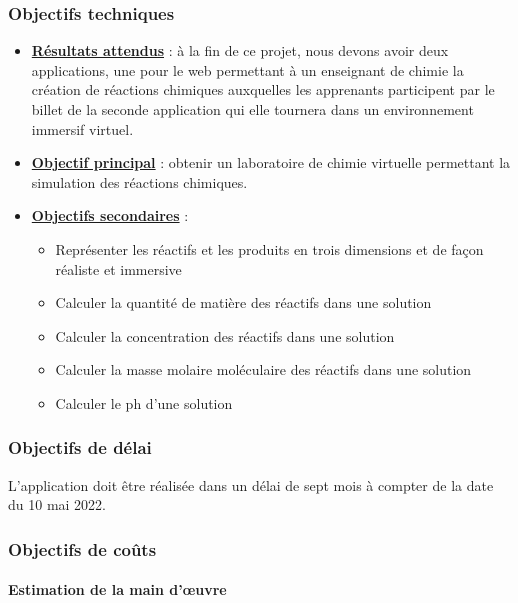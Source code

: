 \subsubsection{Objectifs techniques}
\begin{itemize}
	\item \textbf{\underline{Résultats attendus}} : à la fin de ce projet, nous devons avoir deux applications, une pour le web permettant à un enseignant de chimie la création de réactions chimiques auxquelles les apprenants participent par le billet de la seconde application qui elle tournera dans un environnement immersif virtuel.
	\item \textbf{\underline{Objectif principal}} : obtenir un laboratoire de chimie virtuelle permettant la simulation des réactions chimiques.
	\item \textbf{\underline{Objectifs secondaires}} :
	      \begin{itemize}
		      \item Représenter les réactifs et les produits en trois dimensions et de façon réaliste et immersive
		      \item Calculer la quantité de matière des réactifs dans une solution
		      \item Calculer la concentration des réactifs dans une solution
		      \item Calculer la masse molaire moléculaire des réactifs dans une solution
		      \item Calculer le ph d’une solution
	      \end{itemize}
\end{itemize}

\subsubsection{Objectifs de délai}

L’application doit être réalisée dans un délai de sept mois à compter de la date du 10 mai 2022.

\subsubsection{Objectifs de coûts}

\paragraph{Estimation de la main d’œuvre}


